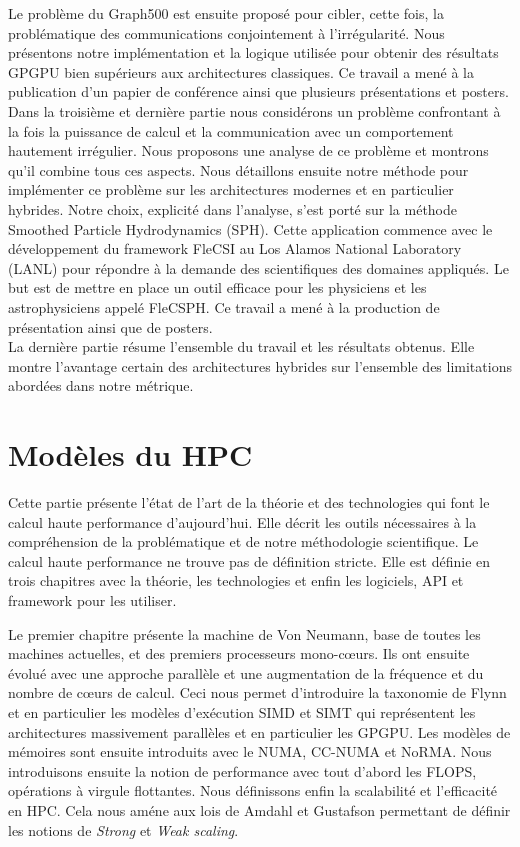\documentclass[12pt,a4paper]{report}
\begin{document}
Le problème du Graph500 est ensuite proposé pour cibler, cette fois, la problématique des communications conjointement à l'irrégularité. 
Nous présentons notre implémentation et la logique utilisée pour obtenir des résultats GPGPU bien supérieurs aux architectures classiques. 
Ce travail a mené à la publication d'un papier de conférence\cite{krajecki2016bfs} ainsi que plusieurs présentations et posters\cite{loiseau2015parcours,loiseau2015GTC}.\\

Dans la troisième et dernière partie nous considérons un problème confrontant à la fois la puissance de calcul et la communication avec un comportement hautement irrégulier. 
Nous proposons une analyse de ce problème et montrons qu'il combine tous ces aspects. 
Nous détaillons ensuite notre méthode pour implémenter ce problème sur les architectures modernes et en particulier hybrides. 
Notre choix, explicité dans l'analyse, s'est porté sur la méthode Smoothed Particle Hydrodynamics (SPH).
Cette application commence avec le développement du framework FleCSI au Los Alamos National Laboratory (LANL) pour répondre à la demande des scientifiques des domaines appliqués. 
Le but est de mettre en place un outil efficace pour les physiciens et les astrophysiciens appelé FleCSPH. 
Ce travail a mené à la production de présentation ainsi que de posters\cite{debrye20162HOT,loiseau2017SC}.\\

La dernière partie résume l'ensemble du travail et les résultats obtenus. 
Elle montre l'avantage certain des architectures hybrides sur l'ensemble des limitations abordées dans notre métrique.

\section{Modèles du HPC}
Cette partie présente l'état de l'art de la théorie et des technologies qui font le calcul haute performance d'aujourd'hui.
Elle décrit les outils nécessaires à la compréhension de la problématique et de notre méthodologie scientifique. 
Le calcul haute performance ne trouve pas de définition stricte. 
Elle est définie en trois chapitres avec la théorie, les technologies et enfin les logiciels, API et framework pour les utiliser. 

Le premier chapitre présente la machine de Von Neumann, base de toutes les machines actuelles, et des premiers processeurs mono-cœurs. 
Ils ont ensuite évolué avec une approche parallèle et une augmentation de la fréquence et du nombre de cœurs de calcul. 
Ceci nous permet d'introduire la taxonomie de Flynn et en particulier les modèles d'exécution SIMD et SIMT qui représentent les architectures massivement parallèles et en particulier les GPGPU. 
Les modèles de mémoires sont ensuite introduits avec le NUMA, CC-NUMA et NoRMA.
Nous introduisons ensuite la notion de performance avec tout d'abord les FLOPS, opérations à virgule flottantes. 
Nous définissons enfin la scalabilité et l'efficacité en HPC.
Cela nous améne aux lois de Amdahl et Gustafson permettant de définir les notions de \textit{Strong} et \textit{Weak scaling}.
\end{document}
